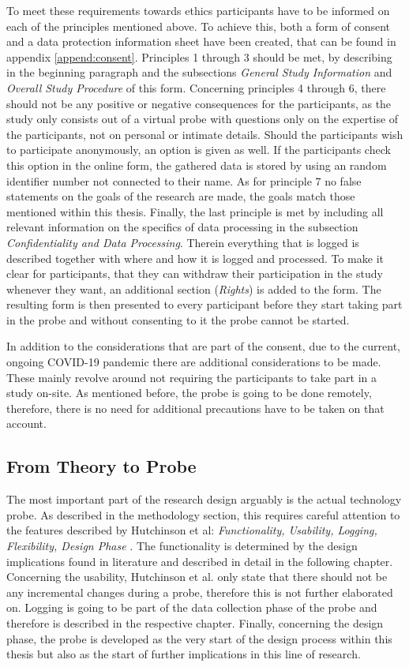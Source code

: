 To meet these requirements towards ethics participants have to be informed on each of the principles mentioned above. To achieve this, both a form of consent and a data protection information sheet have been created, that can be found in appendix \ref{append:consent}. Principles 1 through 3 should be met, by describing in the beginning paragraph and the subsections \textit{General Study Information} and \textit{Overall Study Procedure} of this form. Concerning principles 4 through 6, there should not be any positive or negative consequences for the participants, as the study only consists out of a virtual probe with questions only on the expertise of the participants, not on personal or intimate details. Should the participants wish to participate anonymously, an option is given as well. If the participants check this option in the online form, the gathered data is stored by using an random identifier number not connected to their name. As for principle 7 no false statements on the goals of the research are made, the goals match those mentioned within this thesis. Finally, the last principle is met by including all relevant information on the specifics of data processing in the subsection \textit{Confidentiality and Data Processing}. Therein everything that is logged is described together with where and how it is logged and processed. To make it clear for participants, that they can withdraw their participation in the study whenever they want, an additional section (\textit{Rights}) is added to the form. The resulting form is then presented to every participant before they start taking part in the probe and without consenting to it the probe cannot be started.

In addition to the considerations that are part of the consent, due to the current, ongoing COVID-19 pandemic there are additional considerations to be made. These mainly revolve around not requiring the participants to take part in a study on-site. As mentioned before, the probe is going to be done remotely, therefore, there is no need for additional precautions have to be taken on that account.

\subsection{From Theory to Probe}

The most important part of the research design arguably is the actual technology probe. As described in the methodology section, this requires careful attention to the features described by Hutchinson et al: \textit{Functionality, Usability, Logging, Flexibility, Design Phase} \cite[p. 499-500]{hutchinson2003technology}. The functionality is determined by the design implications found in literature and described in detail in the following chapter. Concerning the usability, Hutchinson et al. only state that there should not be any incremental changes during a probe, therefore this is not further elaborated on. Logging is going to be part of the data collection phase of the probe and therefore is described in the respective chapter. Finally, concerning the design phase, the probe is developed as the very start of the design process within this thesis but also as the start of further implications in this line of research.

